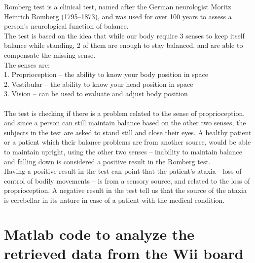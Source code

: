 \documentclass[twoside]{ctuthesis}
\theoremstyle{plain}
\theoremstyle{definition}
\theoremstyle{note}
\begin{document}
Romberg test is a clinical test, named after the German neurologist Moritz Heinrich Romberg (1795–1873), and was used for over 100 years to assess a person's neurological function of balance\cite{Physio}.\\ 
The test is based on the idea that while our body require 3 senses to keep itself balance while standing, 2 of them are enough to stay balanced, and are able to compensate the missing sense\cite{Physio}.\\ 
The senses are:\\ 
1. Proprioception – the ability to know your body position in space\\
2. Vestibular – the ability to know your head position in space\\
3. Vision – can be used to evaluate and adjust body position \\
\\
The test is checking if there is a problem related to the sense of proprioception, and since a person can still maintain balance based on the other two senses, the subjects in the test are asked to stand still and close their eyes. A healthy patient or a patient which their balance problems are from another source, would be able to maintain upright, using the other two senses – inability to maintain balance and falling down is considered a positive result in the Romberg test\cite{Physio}.\\ 
Having a positive result in the test can point that the patient's ataxia - loss of control of bodily movements – is from a sensory source, and related to the loss of proprioception. A negative result in the test tell us that the source of the ataxia is cerebellar in its nature in case of a patient with the medical condition\cite{Physio}.\\


\chapter{Matlab code to analyze the retrieved data from the Wii board} 
\end{document}
